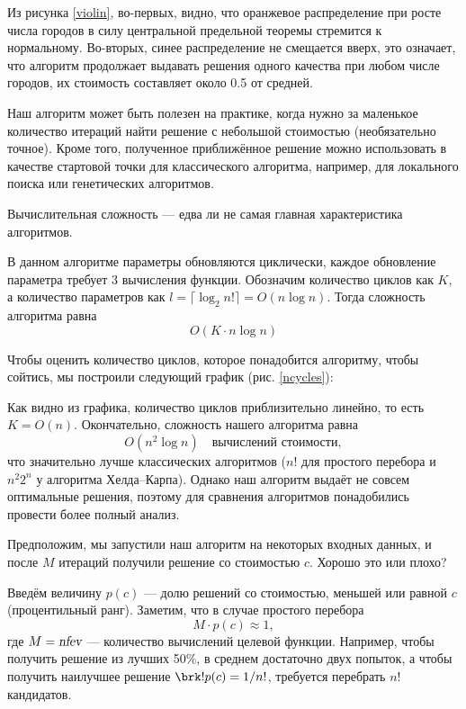 Из рисунка \ref{violin}, во-первых, видно, что оранжевое распределение при росте числа городов в силу центральной предельной теоремы стремится к нормальному. Во-вторых, синее распределение не смещается вверх, это означает, что алгоритм продолжает выдавать решения одного качества при любом числе городов, их стоимость составляет около 0.5 от средней.

Наш алгоритм может быть полезен на практике, когда нужно за маленькое количество итераций найти решение с небольшой стоимостью (необязательно точное). Кроме того, полученное приближённое решение можно использовать в качестве стартовой точки для классического алгоритма, например, для локального поиска или генетических алгоритмов.


Вычислительная сложность --- едва ли не самая главная характеристика алгоритмов.

В данном алгоритме параметры обновляются циклически, каждое обновление параметра требует 3 вычисления функции. Обозначим количество циклов как $K$, а количество параметров как $l = \lceil \log_2 n! \rceil = O(n \log n)$. Тогда сложность алгоритма равна
$$
O(K \cdot n \log n)
$$

Чтобы оценить количество циклов, которое понадобится алгоритму, чтобы сойтись, мы построили следующий график (рис. \ref{ncycles}):


Как видно из графика, количество циклов приблизительно линейно, то есть $K = O(n)$. Окончательно, сложность нашего алгоритма равна
$$
O(n^2 \log n) \quad \text{вычислений стоимости},
$$
что значительно лучше классических алгоритмов ($n!$ для простого перебора и $n^2 2^n$ у алгоритма Хелда--Карпа). Однако наш алгоритм выдаёт не совсем оптимальные решения, поэтому для сравнения алгоритмов понадобились провести более полный анализ.


Предположим, мы запустили наш алгоритм на некоторых входных данных, и после $M$ итераций получили решение со стоимостью $c$. Хорошо это или плохо?

Введём величину $p(c)$ --- долю решений со стоимостью, меньшей или равной $c$ (процентильный ранг). Заметим, что в случае простого перебора
$$
M \cdot p(c) \approx 1,
$$
где $M = \textsl{nfev}$ --- количество вычислений целевой функции. Например, чтобы получить решение из лучших 50\%, в среднем достаточно двух попыток, а чтобы получить наилучшее решение $\brk!{p(c) = 1/n!}$, требуется перебрать $n!$ кандидатов.


